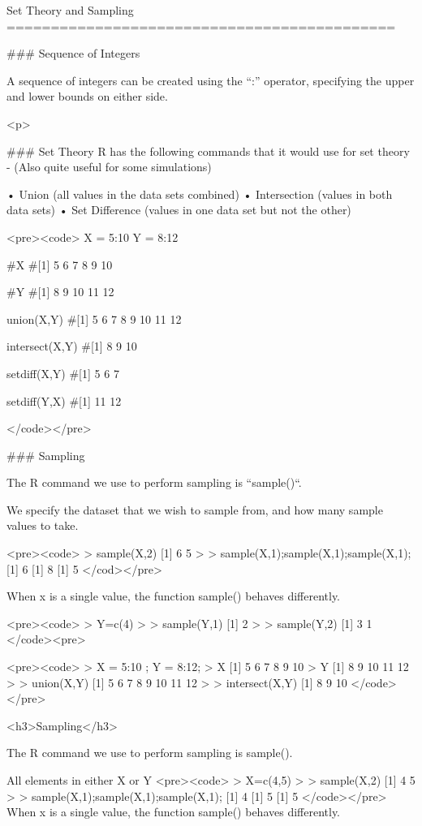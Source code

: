 Set Theory and Sampling
============================================



### Sequence of Integers

A sequence of integers can be created using the “:” operator, specifying the upper and lower bounds on either side.

<p>

### Set Theory
R has the following commands that it would use for set theory  - (Also quite useful for some simulations)

•	Union	              (all values in the data sets combined)
•	Intersection       (values in both data sets)
•	Set Difference  (values in one data set but not the other)

<pre><code>
X = 5:10
Y = 8:12

#X
#[1] 5 6 7 8 9 10

#Y
#[1] 8 9 10 11 12

union(X,Y)
#[1] 5 6 7 8 9 10 11 12

intersect(X,Y)
#[1] 8 9 10

setdiff(X,Y)
#[1] 5 6 7

setdiff(Y,X)
#[1] 11 12

</code></pre>

### Sampling

The R command we use to perform sampling is ``sample()``.

We specify the dataset that we wish to sample from, and how many sample values to take.

<pre><code>
> sample(X,2)
[1] 6 5
>
> sample(X,1);sample(X,1);sample(X,1);
[1] 6
[1] 8
[1] 5
</cod></pre>

When x is a single value, the function sample() behaves differently.

<pre><code>
> Y=c(4)
>
> sample(Y,1)
[1] 2
> 
> sample(Y,2)
[1] 3 1
</code><pre>


<pre><code>
> X = 5:10 ; Y = 8:12;
> X
[1]  5  6  7  8  9 10
> Y
[1]  8  9 10 11 12
>
> union(X,Y)
[1]  5  6  7  8  9 10 11 12
>
> intersect(X,Y)
[1]  8  9 10
</code></pre>

<h3>Sampling</h3>

The R command we use to perform sampling is sample().

All elements in either X or Y
<pre><code>
> X=c(4,5)
>
> sample(X,2)
[1] 4 5
>
> sample(X,1);sample(X,1);sample(X,1);
[1] 4
[1] 5
[1] 5
</code></pre>
When x is a single value, the function sample() behaves differently.

